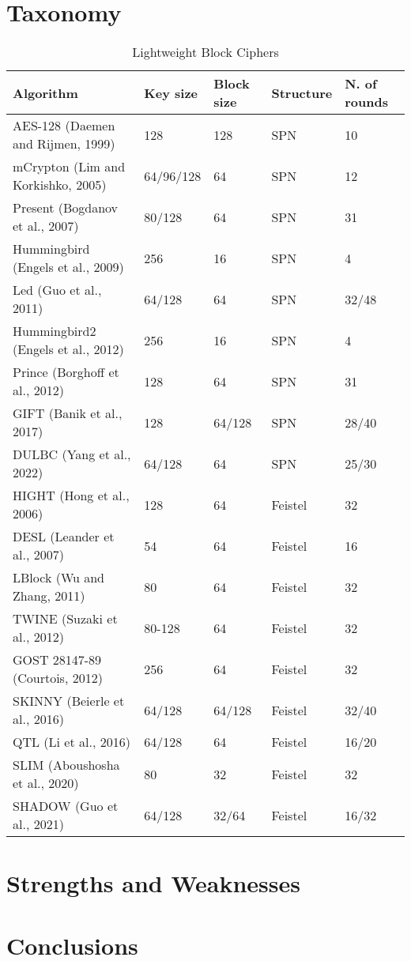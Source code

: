 \documentclass[conference,compsoc]{IEEEtran}
\begin{document}
\section{Taxonomy}
\lipsum[1-5]
\begin{table*}[ht]
    \centering
    \caption{Lightweight Block Ciphers}
    \begin{tabular}{lllll} 
     \toprule
     Algorithm & Key size & Block size & Structure & N. of rounds \\ 
     \midrule
     AES-128 (Daemen and Rijmen, 1999)\cite{AES-128}\cite{AES} & 128 & 128 & SPN & 10 \\ 
     mCrypton (Lim and Korkishko, 2005)\cite{MCRYPTON} & 64/96/128 & 64 & SPN & 12 \\
     Present (Bogdanov et al., 2007)\cite{PRESENT} & 80/128 & 64 & SPN & 31 \\
     Hummingbird (Engels et al., 2009)\cite{HUMMINGBIRD} & 256 & 16 & SPN & 4 \\
     Led (Guo et al., 2011)\cite{LED} & 64/128 & 64 & SPN & 32/48 \\
     Hummingbird2 (Engels et al., 2012)\cite{HUMMINGBIRD2} & 256 & 16 & SPN & 4 \\
     Prince (Borghoff et al., 2012)\cite{PRINCE} & 128 & 64 & SPN & 31 \\
     GIFT (Banik et al., 2017)\cite{GIFT} & 128 & 64/128 & SPN & 28/40 \\
     DULBC (Yang et al., 2022) \cite{DULBC} & 64/128 & 64 & SPN & 25/30 \\
     HIGHT (Hong et al., 2006)\cite{HIGHT} & 128 & 64 & Feistel & 32 \\
     DESL (Leander et al., 2007)\cite{DESL} & 54 & 64 & Feistel & 16 \\
     LBlock (Wu and Zhang, 2011)\cite{LBLOCK} & 80 & 64 & Feistel & 32 \\
     TWINE (Suzaki et al., 2012)\cite{TWINE} & 80-128 & 64 & Feistel & 32 \\
     GOST 28147-89 (Courtois, 2012)\cite{GOST} & 256 & 64 & Feistel & 32 \\
     SKINNY (Beierle et al., 2016)\cite{SKINNY} & 64/128 & 64/128 & Feistel & 32/40 \\
     QTL (Li et al., 2016)\cite{QTL} & 64/128 & 64 & Feistel & 16/20 \\
     SLIM (Aboushosha et al., 2020)\cite{SLIM} & 80 & 32 & Feistel & 32 \\
     SHADOW (Guo et al., 2021)\cite{SHADOW} & 64/128 & 32/64 & Feistel & 16/32 \\
     \bottomrule
    \end{tabular}
\end{table*}
\lipsum[1-5]
\section{Strengths and Weaknesses}
\lipsum[1-5]
\section{Conclusions}
\lipsum[1-5]


\end{document}
